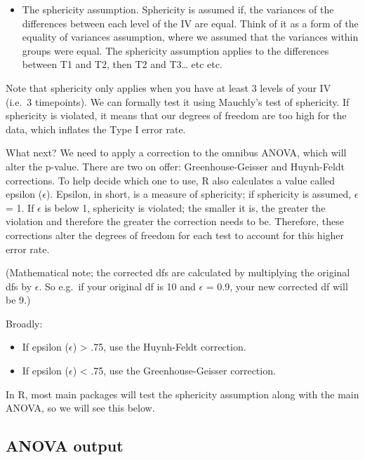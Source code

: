 \documentclass[
]{book}
\providecommand{\tightlist}{%
  \setlength{\itemsep}{0pt}\setlength{\parskip}{0pt}}
\begin{document}
\begin{itemize}
\tightlist
\item
  The sphericity assumption. Sphericity is assumed if, the variances of the differences between each level of the IV are equal. Think of it as a form of the equality of variances assumption, where we assumed that the variances within groups were equal. The sphericity assumption applies to the differences between T1 and T2, then T2 and T3\ldots{} etc etc.
\end{itemize}

Note that sphericity only applies when you have at least 3 levels of your IV (i.e.~3 timepoints). We can formally test it using Mauchly's test of sphericity. If sphericity is violated, it means that our degrees of freedom are too high for the data, which inflates the Type I error rate.

What next? We need to apply a correction to the omnibus ANOVA, which will alter the p-value. There are two on offer: Greenhouse-Geisser and Huynh-Feldt corrections. To help decide which one to use, R also calculates a value called epsilon (\(\epsilon\)). Epsilon, in short, is a measure of sphericity; if sphericity is assumed, \(\epsilon\) = 1. If \(\epsilon\) is below 1, sphericity is violated; the smaller it is, the greater the violation and therefore the greater the correction needs to be. Therefore, these corrections alter the degrees of freedom for each
test to account for this higher error rate.

(Mathematical note; the corrected dfs are calculated by multiplying the original dfs by \(\epsilon\). So e.g.~if your original df is 10 and \(\epsilon\) = 0.9, your new corrected df will be 9.)

Broadly:

\begin{itemize}
\tightlist
\item
  If epsilon (\(\epsilon\)) \textgreater{} .75, use the Huynh-Feldt correction.
\item
  If epsilon (\(\epsilon\)) \textless{} .75, use the Greenhouse-Geisser
  correction.
\end{itemize}

In R, most main packages will test the sphericity assumption along with the main ANOVA, so we will see this below.

\hypertarget{anova-output}{%
\subsection{ANOVA output}\label{anova-output}}
\end{document}
